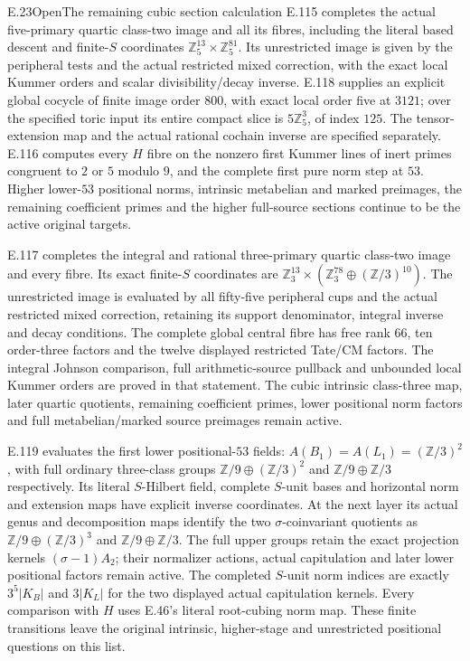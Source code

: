 \begin{statement}{E.23}{Open}{The remaining cubic section calculation}
E.115 completes the actual five-primary quartic class-two image
and all its fibres, including the literal based descent and
finite-$S$ coordinates $\mathbb Z_5^{13}\times\mathbb Z_5^{81}$.
Its unrestricted image is given by the peripheral tests and the
actual restricted mixed correction, with the exact local Kummer
orders and scalar divisibility/decay inverse.
E.118 supplies an explicit global cocycle of finite image order
$800$, with exact local order five at $3121$; over the specified
toric input its entire compact slice is $5\mathbb Z_5^3$,
of index $125$. The tensor-extension map and the actual rational
cochain inverse are specified separately.
E.116 computes every $H$ fibre on the nonzero first Kummer lines
of inert primes congruent to $2$ or $5$ modulo $9$, and the
complete first pure norm step at $53$. Higher lower-$53$
positional norms, intrinsic metabelian and marked preimages,
the remaining coefficient primes and the higher full-source
sections continue to be the active original targets.

E.117 completes the integral and rational three-primary quartic
class-two image and every fibre. Its exact finite-$S$ coordinates
are $\mathbb Z_3^{13}\times(\mathbb Z_3^{78}\oplus(\mathbb Z/3)^{10})$.
The unrestricted image is evaluated by all fifty-five peripheral
cups and the actual restricted mixed correction, retaining its
support denominator, integral inverse and decay conditions.
The complete global central fibre has free rank $66$, ten
order-three factors and the twelve displayed restricted Tate/CM
factors. The integral Johnson comparison, full arithmetic-source
pullback and unbounded local Kummer orders are proved in that
statement. The cubic intrinsic class-three map, later quartic
quotients, remaining coefficient primes, lower positional norm
factors and full metabelian/marked source preimages remain active.

E.119 evaluates the first lower positional-$53$ fields:
$A(B_1)=A(L_1)=(\mathbb Z/3)^2$, with full ordinary
three-class groups $\mathbb Z/9\oplus(\mathbb Z/3)^2$
and $\mathbb Z/9\oplus\mathbb Z/3$ respectively.
Its literal $S$-Hilbert field, complete $S$-unit bases and
horizontal norm and extension maps have explicit inverse
coordinates. At the next layer its actual genus and decomposition
maps identify the two $\sigma$-coinvariant quotients as
$\mathbb Z/9\oplus(\mathbb Z/3)^3$ and
$\mathbb Z/9\oplus\mathbb Z/3$.
The full upper groups retain the exact projection kernels
$(\sigma-1)A_2$; their normalizer actions, actual capitulation
and later lower positional factors remain active.
The completed $S$-unit norm indices are exactly $3^5|K_B|$
and $3|K_L|$ for the two displayed actual capitulation kernels.
Every comparison with $H$ uses E.46's literal root-cubing norm
map. These finite transitions leave the original intrinsic,
higher-stage and unrestricted positional questions on this list.


\end{statement}

